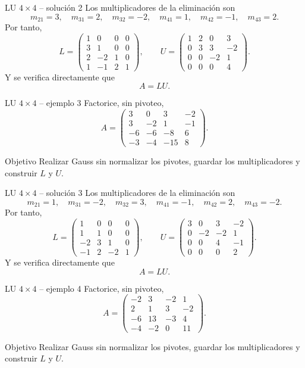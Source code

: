\documentclass[aspectratio=169,10pt]{beamer}
\begin{document}
\begin{frame}{LU $4\times 4$ -- solución 2}
\small
Los multiplicadores de la eliminación son
\[
m_{21}=3,\quad m_{31}=2,\quad m_{32}=-2,\quad m_{41}=1,\quad m_{42}=-1,\quad m_{43}=2.
\]
Por tanto,
\[
L=\begin{pmatrix}1 & 0 & 0 & 0\\3 & 1 & 0 & 0\\2 & -2 & 1 & 0\\1 & -1 & 2 & 1\end{pmatrix},\qquad U=\begin{pmatrix}1 & 2 & 0 & 3\\0 & 3 & 3 & -2\\0 & 0 & -2 & 1\\0 & 0 & 0 & 4\end{pmatrix}.
\]
Y se verifica directamente que
\[
\boxed{A=LU}.
\]
\end{frame}
\begin{frame}{LU $4\times 4$ -- ejemplo 3}
\small
Factorice, sin pivoteo,
\[
A=\begin{pmatrix}3 & 0 & 3 & -2\\3 & -2 & 1 & -1\\-6 & -6 & -8 & 6\\-3 & -4 & -15 & 8\end{pmatrix}.
\]
\begin{block}{Objetivo}
Realizar Gauss sin normalizar los pivotes, guardar los multiplicadores y construir $L$ y $U$.
\end{block}
\end{frame}
\begin{frame}{LU $4\times 4$ -- solución 3}
\small
Los multiplicadores de la eliminación son
\[
m_{21}=1,\quad m_{31}=-2,\quad m_{32}=3,\quad m_{41}=-1,\quad m_{42}=2,\quad m_{43}=-2.
\]
Por tanto,
\[
L=\begin{pmatrix}1 & 0 & 0 & 0\\1 & 1 & 0 & 0\\-2 & 3 & 1 & 0\\-1 & 2 & -2 & 1\end{pmatrix},\qquad U=\begin{pmatrix}3 & 0 & 3 & -2\\0 & -2 & -2 & 1\\0 & 0 & 4 & -1\\0 & 0 & 0 & 2\end{pmatrix}.
\]
Y se verifica directamente que
\[
\boxed{A=LU}.
\]
\end{frame}
\begin{frame}{LU $4\times 4$ -- ejemplo 4}
\small
Factorice, sin pivoteo,
\[
A=\begin{pmatrix}-2 & 3 & -2 & 1\\2 & 1 & 3 & -2\\-6 & 13 & -3 & 4\\-4 & -2 & 0 & 11\end{pmatrix}.
\]
\begin{block}{Objetivo}
Realizar Gauss sin normalizar los pivotes, guardar los multiplicadores y construir $L$ y $U$.
\end{block}
\end{frame}
\end{document}
